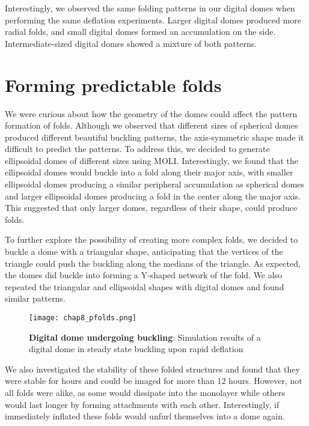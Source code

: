 Interestingly, we observed the same folding patterns in our digital
domes when performing the same deflation experiments. Larger digital
domes produced more radial folds, and small digital domes formed an
accumulation on the side. Intermediate-sized digital domes showed a
mixture of both patterns.

\hypertarget{forming-predictable-folds}{%
	\section{Forming predictable folds}\label{forming-predictable-folds}}

We were curious about how the geometry of the domes could affect the
pattern formation of folds. Although we observed that different sizes of
spherical domes produced different beautiful buckling patterns, the
axis-symmetric shape made it difficult to predict the patterns. To
address this, we decided to generate ellipsoidal domes of different
sizes using MOLI. Interestingly, we found that the ellipsoidal domes
would buckle into a fold along their major axis, with smaller
ellipsoidal domes producing a similar peripheral accumulation as
spherical domes and larger ellipsoidal domes producing a fold in the
center along the major axis. This suggested that only larger domes,
regardless of their shape, could produce folds.

To further explore the possibility of creating more complex folds, we
decided to buckle a dome with a triangular shape, anticipating that the
vertices of the triangle could push the buckling along the medians of
the triangle. As expected, the domes did buckle into forming a Y-shaped
network of the fold. We also repeated the triangular and ellipsoidal
shapes with digital domes and found similar patterns.

\begin{figure}[h!]
	\centering
	\texttt{[image: chap8\_pfolds.png]}
	\caption{\label{fig_8_7} \textbf{Digital dome undergoing buckling}: Simulation results of a digital dome in steady state buckling upon rapid deflation
	}
\end{figure}

We also investigated the stability of these folded structures and found
that they were stable for hours and could be imaged for more than 12
hours. However, not all folds were alike, as some would dissipate into
the monolayer while others would last longer by forming attachments with
each other. Interestingly, if immediately inflated these folds would
unfurl themselves into a dome again.

